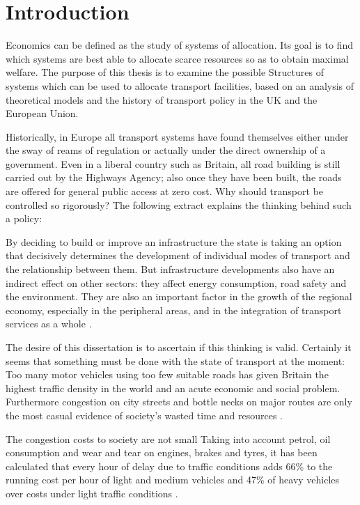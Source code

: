 \chapter{Introduction}

Economics can be defined as the study of systems of allocation. Its goal is to find which systems are best able to allocate scarce resources so as to obtain maximal welfare. The purpose of this thesis is to examine the possible Structures of systems which can be used to allocate transport facilities, based on an analysis of theoretical models and the history of transport policy in the UK and the European Union.

Historically, in Europe all transport systems have found themselves either under the sway of reams of regulation or actually under the direct ownership of a government. Even in a liberal country such as Britain, all road building is still carried out by the Highways Agency; also once they have been built, the roads are offered for general public access at zero cost. Why should transport be controlled so rigorously? The following extract explains the thinking behind such a policy:

\begin{displayquote}
By deciding to build or improve an infrastructure the state is taking an option that decisively determines the development of individual modes of transport and the relationship between them. But infrastructure developments also have an indirect effect on other sectors: they affect energy consumption, road safety and the environment. They are also an important factor in the growth of the regional economy, especially in the peripheral areas, and in the integration of transport services as a whole \citep{Stasinopoulos:1995}.
\end{displayquote}

The desire of this dissertation is to ascertain if this thinking is valid. Certainly it seems that something must be done with the state of transport at the moment: Too many motor vehicles using too few suitable roads has given Britain the highest traffic density in the world and an acute economic and social problem. Furthermore congestion on city streets and bottle necks on major routes are only the most casual evidence of society's wasted time and resources \citep{Rodgers:1959}.
 
The congestion costs to society are not small Taking into account petrol, oil consumption and wear and tear on engines, brakes and tyres, it has been calculated that every hour of delay due to traffic conditions adds 66\% to the running cost per hour of light and medium vehicles and 47\% of heavy vehicles over costs under light traffic conditions \citep{Glanville:1957}.

